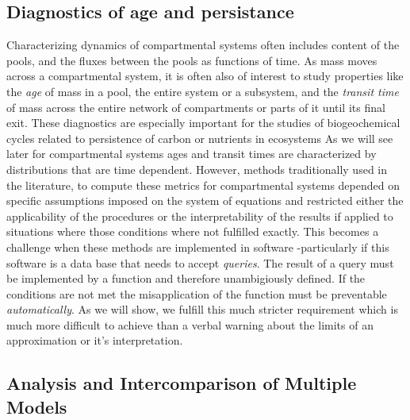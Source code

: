 \subsection{Diagnostics of age and persistance} 
Characterizing dynamics of compartmental systems often includes content of the pools,
and the fluxes between the pools as functions of time.
As mass moves across a compartmental system, it is often also of interest to study
properties like the \emph{age} of mass in a pool, the entire system
or a subsystem, and the \emph{transit time} of mass 
across the entire network of compartments or parts of it until its
final exit. These diagnostics are especially important for the studies of biogeochemical cycles 
related to persistence of carbon or nutrients in ecosystems \cite{schmidt_persistence_2011, friedlingstein_uncertainties_2014, woolf_microbial_2019, kyker-snowman_stoichiometrically_2020}
As we will see later for compartmental systems ages and transit times are characterized by
distributions that are time dependent. 
However, methods traditionally used in the literature, to compute these metrics for
compartmental systems depended on specific assumptions imposed on the system
of equations \cite{Sierra2017GCB} and restricted either the applicability 
of the procedures or the interpretability of the results if applied to situations 
where those conditions where not fulfilled exactly. 
This becomes a challenge when these methods are implemented in software
-particularly if this software is a data base that needs to accept \emph{queries}. The result of a query must be implemented by a function and therefore unambigiously defined. If the conditions are not met the misapplication of the function must be preventable \emph{automatically}.
As we will show, we fulfill this much stricter requirement which is much more difficult to achieve than a verbal warning about the limits of an approximation or it's interpretation.


\subsection{Analysis and Intercomparison of Multiple Models \label{sec:Intercomparison}}

